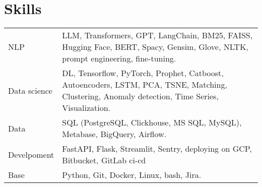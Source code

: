 \documentclass[a4paper,12pt]{article}
\begin{document}
\section{Skills}
\begin{tabularx}{\linewidth}{@{}l X@{}}
NLP &  \normalsize{LLM, Transformers, GPT, LangChain, BM25, FAISS, Hugging Face, BERT, Spacy, Gensim, Glove, NLTK, prompt engineering, fine-tuning.}\\
Data science  &  \normalsize{DL, Tensorflow, PyTorch, Prophet, Catboost, Autoencoders, LSTM, PCA, TSNE, Matching, Clustering, Anomaly detection, Time Series, Visualization.}\\
Data &  \normalsize{SQL (PostgreSQL, Clickhouse, MS SQL, MySQL), Metabase, BigQuery, Airflow.}\\
Develpoment &  \normalsize{FastAPI, Flask, Streamlit, Sentry, deploying on GCP, Bitbucket, GitLab ci-cd} \\
Base &  \normalsize{Python, Git, Docker, Linux, bash, Jira.}
\end{tabularx}

\vfill
{}
\end{document}
